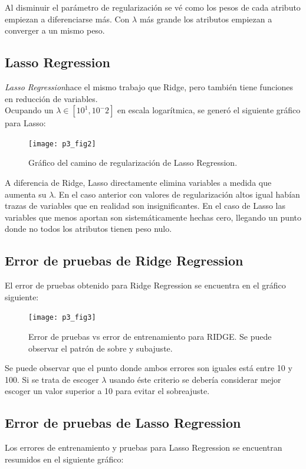 \documentclass[letter, 10pt]{article}
\begin{document}
Al disminuir el parámetro de regularización se vé como los pesos de cada
atributo empiezan a diferenciarse más. Con $\lambda$ más grande los atributos
empiezan a converger a un mismo peso.
\subsection{Lasso Regression}
\textit{Lasso Regression}hace el mismo trabajo que Ridge, pero también tiene
funciones en reducción de variables.\\

Ocupando un $\lambda \in [10^1,10^-2]$ en escala logarítmica, se generó el
siguiente gráfico para Lasso:


\begin{figure}[H]
  \centering
  \texttt{[image: p3\_fig2]} 
  \caption{Gráfico del camino de regularización de Lasso Regression.}
  \label{fig:p3_g1}
\end{figure}

A diferencia de Ridge, Lasso directamente elimina variables a medida que aumenta
su $\lambda$. En el caso anterior con valores de regularización altos igual
habían trazas de variables que en realidad son insignificantes. En el caso de
Lasso las variables que menos aportan son sistemáticamente hechas cero, llegando
un punto donde no todos los atributos tienen peso nulo.

\subsection{Error de pruebas de Ridge Regression}
El error de pruebas obtenido para Ridge Regression se encuentra en el gráfico
siguiente:

\begin{figure}[H]
  \centering
  \texttt{[image: p3\_fig3]} 
  \caption{Error de pruebas vs error de entrenamiento para RIDGE. Se puede
    observar el patrón de sobre y subajuste.}
  \label{fig:p3_g2}
\end{figure}

Se puede observar que el punto donde ambos errores son iguales está entre 10 y
100. Si se trata de escoger $\lambda$ usando éste criterio se debería considerar
mejor escoger un valor superior a 10 para evitar el sobreajuste.
\subsection{Error de pruebas de Lasso Regression}
Los errores de entrenamiento y pruebas para Lasso Regression se encuentran
resumidos en el siguiente gráfico:
\end{document}
